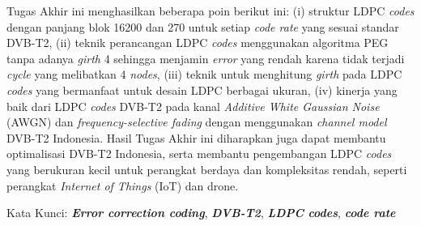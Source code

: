 Tugas Akhir ini menghasilkan beberapa poin berikut ini: (i) struktur LDPC \textit{codes} dengan panjang blok 16200 dan 270 untuk setiap \textit{code rate} yang sesuai  standar DVB-T2, (ii) teknik perancangan LDPC \textit{codes} menggunakan algoritma PEG tanpa adanya \textit{girth} 4 sehingga menjamin \textit{error} yang rendah karena tidak terjadi \textit{cycle} yang melibatkan 4 \textit{nodes}, (iii) teknik untuk menghitung \textit{girth} pada LDPC \textit{codes} yang bermanfaat untuk desain LDPC berbagai ukuran, (iv) kinerja yang baik dari LDPC \textit{codes} DVB-T2 pada kanal \textit{Additive White Gaussian Noise} (AWGN) dan \textit{frequency-selective fading} dengan menggunakan \textit{channel model} DVB-T2 Indonesia. Hasil Tugas Akhir ini diharapkan juga dapat membantu optimalisasi DVB-T2 Indonesia, serta membantu pengembangan LDPC \textit{codes} yang berukuran kecil untuk perangkat berdaya dan kompleksitas rendah, seperti perangkat \textit{Internet of Things} (IoT) dan drone.
%
%

\noindent Kata Kunci: \textit{\textbf{Error correction coding}}, \textit{\textbf{DVB-T2}}, \textbf{\textit{LDPC} \textit{codes}}, \textbf{\textit{code rate}}

